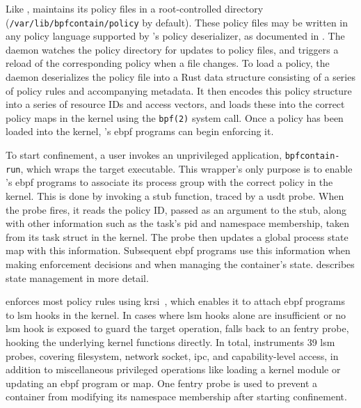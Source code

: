 Like \bpfbox{}, \bpfcontain{} maintains its policy files in a root-controlled directory
(\texttt{/var/lib/bpfcontain/policy} by default). These policy files may be written in any
policy language supported by \bpfcontain{}'s policy deserializer, as documented in
. The \bpfcontain{} daemon watches the policy directory for
updates to policy files, and triggers a reload of the corresponding policy when a file
changes. To load a policy, the daemon deserializes the policy file into a Rust data
structure consisting of a series of policy rules and accompanying metadata. It then
encodes this policy structure into a series of resource IDs and access vectors, and loads
these into the correct policy maps in the kernel using the \texttt{bpf(2)} system call.
Once a policy has been loaded into the kernel, \bpfcontain{}'s \gls{ebpf} programs can
begin enforcing it.

To start confinement, a user invokes an unprivileged application, \texttt{bpfcontain-run},
which wraps the target executable. This wrapper's only purpose is to enable
\bpfcontain{}'s \gls{ebpf} programs to associate its process group with the correct policy
in the kernel.  This is done by invoking a stub function, traced by a \gls{usdt} probe.
When the probe fires, it reads the policy ID, passed as an argument to the stub, along
with other information such as the task's \gls{pid} and namespace membership, taken from
its task struct in the kernel. The probe then updates a global process state map with this
information. Subsequent \gls{ebpf} programs use this information when making enforcement
decisions and when managing the container's state.  describes
state management in more detail.

\bpfcontain{} enforces most policy rules using \gls{krsi}~\cite{singh2019_krsi}, which
enables it to attach \gls{ebpf} programs to \gls{lsm} hooks in the kernel. In cases where
\gls{lsm} hooks alone are insufficient or no \gls{lsm} hook is exposed to guard the target
operation, \bpfcontain{} falls back to an fentry probe, hooking the underlying kernel
functions directly. In total, \bpfcontain{} instruments 39 \gls{lsm} probes, covering
filesystem, network socket, \gls{ipc}, and capability-level access, in addition to
miscellaneous privileged operations like loading a kernel module or updating an \gls{ebpf}
program or map.  One fentry probe is used to prevent a container from modifying its
namespace membership after starting confinement.

